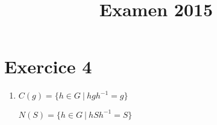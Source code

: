 \documentclass[]{article}
\title{Examen 2015}
\theoremstyle{remark}
\theoremstyle{definition}
\begin{document}
\maketitle

\section*{Exercice 4}

\begin{enumerate}
	\item
	$C(g) = \{h \in G ~ | ~ h g h^{-1} = g\}$
	
	$N(S) = \{h \in G ~ | ~ h S h^{-1} = S\}$
	
\end{enumerate}
\end{document}

